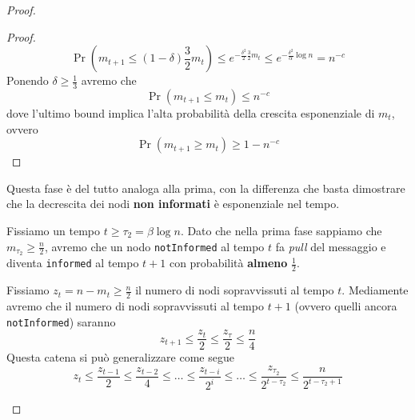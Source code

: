 \begin{teorema}
\begin{proof}
\begin{description}
\begin{lemma}
\begin{proof}
                    \[
                        \Pr\left( m_{t+1} \leq (1 - \delta)\frac{3}{2}m_t \right) \leq e^{-\frac{\delta^2}{2}\frac{3}{2}m_t} \leq e^{-\frac{\delta^2}\alpha \log n} = n^{-c}
                    \]
                    Ponendo $\delta \geq \frac{1}{3}$ avremo che
                    \[
                        \Pr\left( m_{t+1} \leq m_t \right) \leq n^{-c}
                    \]
                    dove l'ultimo bound implica l'alta probabilità della crescita esponenziale di $m_t$, ovvero
                    \[
                        \Pr\left( m_{t+1} \geq m_t \right) \geq 1 - n^{-c}
                    \]
                \end{proof}
            \end{lemma}
            \item[FASE 2] Questa fase è del tutto analoga alla prima, con la differenza che basta dimostrare che la decrescita dei nodi \textbf{non informati} è esponenziale nel tempo.
            
            Fissiamo un tempo $t \geq \tau_2 = \beta \log n$. Dato che nella prima fase sappiamo che $m_{\tau_2} \geq \frac{n}{2}$, avremo che un nodo \texttt{notInformed} al tempo $t$ fa \textit{pull} del messaggio e diventa \texttt{informed} al tempo $t+1$ con probabilità \textbf{almeno} $\frac{1}{2}$.

            Fissiamo $z_t = n - m_t \geq \frac{n}{2}$ il numero di nodi sopravvissuti al tempo $t$. Mediamente avremo che il numero di nodi sopravvissuti al tempo $t+1$ (ovvero quelli ancora \texttt{notInformed}) saranno
            \[
                z_{t+1} \leq \frac{z_t}{2} \leq \frac{z_\tau}{2} \leq \frac{n}{4}
            \]
            Questa catena si può generalizzare come segue
            \[
                z_t \leq \frac{z_{t-1}}{2} \leq \frac{z_{t-2}}{4} \leq \dots \leq \frac{z_{t-i}}{2^i} \leq \dots \leq \frac{z_{\tau_2}}{2^{t - \tau_2}} \leq \frac{n}{2^{t - \tau_2 + 1}}
            \]


\end{description}
\end{proof}
\end{teorema}
